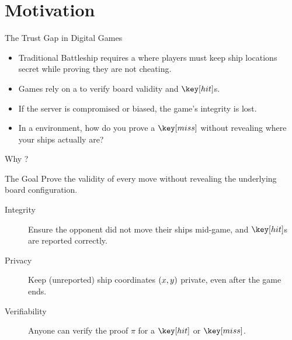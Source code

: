 \section{Motivation}

\begin{frame}{The Trust Gap in Digital Games}
    \begin{itemize}
        \item Traditional Battleship requires a  where players must keep ship locations secret while proving they are not cheating.
        \item Games rely on a  to verify board validity and $\hit$s.
        \item If the server is compromised or biased, the game's integrity is lost.
        \item In a  environment, how do you prove a $\miss$ without revealing where your ships actually are?
    \end{itemize}
\end{frame}

\begin{frame}{Why ?}
    \begin{block}{The Goal}
        Prove the validity of every move without revealing the underlying board configuration.
    \end{block}
    \begin{description}
        \item[Integrity] Ensure the opponent did not move their ships mid-game, and $\hit$s are reported correctly.
        \item[Privacy] Keep (unreported) ship coordinates $\left(x, y\right)$ private, even after the game ends.
        \item[Verifiability] Anyone can verify the proof $\pi$ for a $\hit$ or $\miss$.
    \end{description}
\end{frame}
